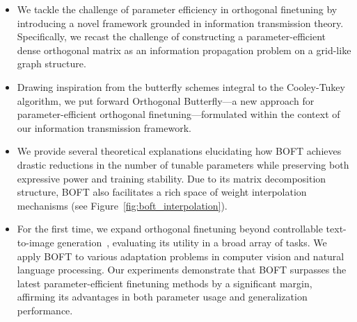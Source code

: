 \begin{itemize}[leftmargin=*,nosep]
    \item We tackle the challenge of parameter efficiency in orthogonal finetuning by introducing a novel framework grounded in information transmission theory. Specifically, we recast the challenge of constructing a parameter-efficient dense orthogonal matrix as an information propagation problem on a grid-like graph structure.
    \item Drawing inspiration from the butterfly schemes integral to the Cooley-Tukey algorithm, we put forward Orthogonal Butterfly—a new approach for parameter-efficient orthogonal finetuning—formulated within the context of our information transmission framework.
    \item We provide several theoretical explanations elucidating how BOFT achieves drastic reductions in the number of tunable parameters while preserving both expressive power and training stability. Due to its matrix decomposition structure, BOFT also facilitates a rich space of weight interpolation mechanisms (see Figure~\ref{fig:boft_interpolation}).
    \item For the first time, we expand orthogonal finetuning beyond controllable text-to-image generation~\cite{qiu2023controlling}, evaluating its utility in a broad array of tasks. We apply BOFT to various adaptation problems in computer vision and natural language processing. Our experiments demonstrate that BOFT surpasses the latest parameter-efficient finetuning methods by a significant margin, affirming its advantages in both parameter usage and generalization performance.
\end{itemize}

